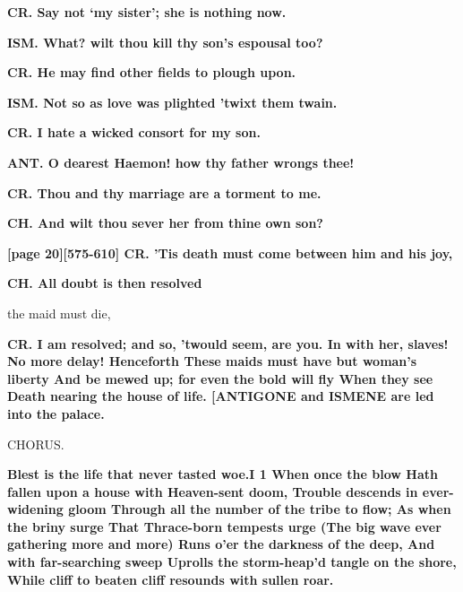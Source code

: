 \documentclass[11pt,letter]{book}
\begin{document}
\par \textbf{CR. Say not ‘my sister’; she is nothing now.}
\par 

\par \textbf{ISM. What? wilt thou kill thy son’s espousal too?}
\par 

\par \textbf{CR. He may find other fields to plough upon.}
\par 

\par \textbf{ISM. Not so as love was plighted ’twixt them twain.}
\par 

\par \textbf{CR. I hate a wicked consort for my son.}
\par 

\par \textbf{ANT. O dearest Haemon! how thy father wrongs thee!}
\par 

\par \textbf{CR. Thou and thy marriage are a torment to me.}
\par 

\par \textbf{CH. And wilt thou sever her from thine own son?}
\par 

\par \textbf{[page 20][575-610] CR. ’Tis death must come between him and his joy,}
\par 

\par \textbf{CH. All doubt is then resolved}
\par   the maid must die,

\par \textbf{CR. I am resolved; and so, ’twould seem, are you. In with her, slaves! No more delay! Henceforth These maids must have but woman’s liberty And be mewed up; for even the bold will fly When they see Death nearing the house of life. [ANTIGONE and ISMENE are led into the palace.}
\par 

\par  CHORUS.

\par \textbf{Blest is the life that never tasted woe.I 1 When once the blow Hath fallen upon a house with Heaven-sent doom, Trouble descends in ever-widening gloom Through all the number of the tribe to flow; As when the briny surge That Thrace-born tempests urge (The big wave ever gathering more and more) Runs o’er the darkness of the deep, And with far-searching sweep Uprolls the storm-heap’d tangle on the shore, While cliff to beaten cliff resounds with sullen roar.}
\par 
\end{document}
